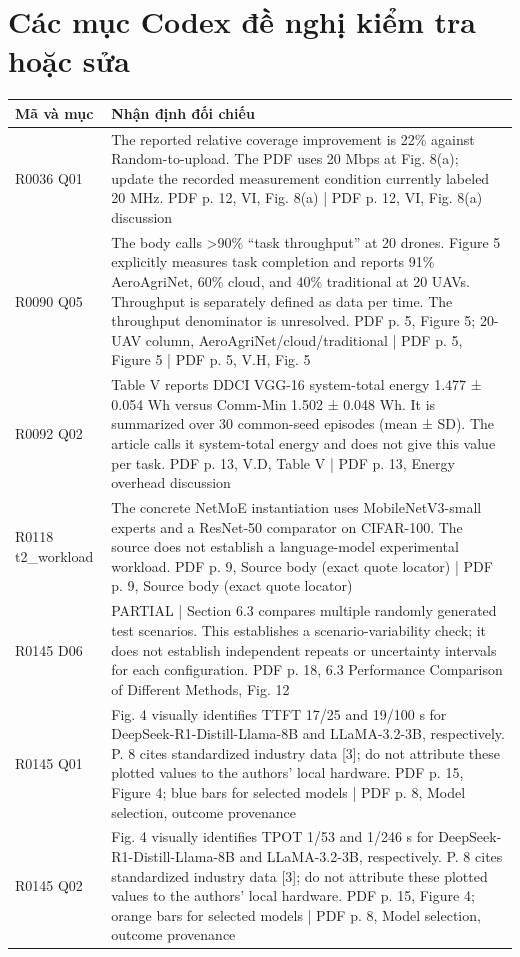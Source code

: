 \section*{Các mục Codex đề nghị kiểm tra hoặc sửa}
\begin{longtable}{p{.15\linewidth}p{.76\linewidth}}\toprule Mã và mục & Nhận định đối chiếu \\ \midrule\endhead
R0036 Q01 & The reported relative coverage improvement is 22\% against Random-to-upload. The PDF uses 20 Mbps at Fig. 8(a); update the recorded measurement condition currently labeled 20 MHz. PDF p. 12, VI, Fig. 8(a) | PDF p. 12, VI, Fig. 8(a) discussion \\
R0090 Q05 & The body calls >90\% “task throughput” at 20 drones. Figure 5 explicitly measures task completion and reports 91\% AeroAgriNet, 60\% cloud, and 40\% traditional at 20 UAVs. Throughput is separately defined as data per time. The throughput denominator is unresolved. PDF p. 5, Figure 5; 20-UAV column, AeroAgriNet/cloud/traditional | PDF p. 5, Figure 5 | PDF p. 5, V.H, Fig. 5 \\
R0092 Q02 & Table V reports DDCI VGG-16 system-total energy 1.477 ± 0.054 Wh versus Comm-Min 1.502 ± 0.048 Wh. It is summarized over 30 common-seed episodes (mean ± SD). The article calls it system-total energy and does not give this value per task. PDF p. 13, V.D, Table V | PDF p. 13, Energy overhead discussion \\
R0118 t2\_workload & The concrete NetMoE instantiation uses MobileNetV3-small experts and a ResNet-50 comparator on CIFAR-100. The source does not establish a language-model experimental workload. PDF p. 9, Source body (exact quote locator) | PDF p. 9, Source body (exact quote locator) \\
R0145 D06 & PARTIAL | Section 6.3 compares multiple randomly generated test scenarios. This establishes a scenario-variability check; it does not establish independent repeats or uncertainty intervals for each configuration. PDF p. 18, 6.3 Performance Comparison of Different Methods, Fig. 12 \\
R0145 Q01 & Fig. 4 visually identifies TTFT 17/25 and 19/100 s for DeepSeek-R1-Distill-Llama-8B and LLaMA-3.2-3B, respectively. P. 8 cites standardized industry data [3]; do not attribute these plotted values to the authors’ local hardware. PDF p. 15, Figure 4; blue bars for selected models | PDF p. 8, Model selection, outcome provenance \\
R0145 Q02 & Fig. 4 visually identifies TPOT 1/53 and 1/246 s for DeepSeek-R1-Distill-Llama-8B and LLaMA-3.2-3B, respectively. P. 8 cites standardized industry data [3]; do not attribute these plotted values to the authors’ local hardware. PDF p. 15, Figure 4; orange bars for selected models | PDF p. 8, Model selection, outcome provenance \\
\bottomrule\end{longtable}
